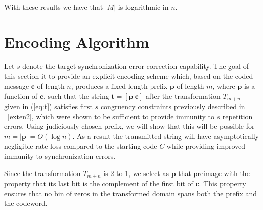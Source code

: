  With these results we have that
$|M|$ is logarithmic in $n$.


\section{Encoding Algorithm}\label{enc}

Let $s$ denote the target synchronization error correction
capability. The goal of this section it to provide an explicit
encoding scheme which, based on the coded message $\mathbf{c}$ of
length $n$, produces a fixed length prefix $\mathbf{p}$ of length
$m$, where $\mathbf{p}$ is a function of $\mathbf{c}$, such that the
string $\mathbf{t}=[ \mathbf{p} ~ \mathbf{c} ]$ after the
transformation $T_{m+n}$ given in (\ref{eq:t}) satisfies first $s$
congruency constraints previously described  in ~\eqref{exten2},
which were shown to be sufficient to provide immunity to $s$
repetition errors. Using judiciously chosen prefix, we will show
that this will be possible for $m=|\mathbf{p}|=O(\log n)$. As a
result the transmitted string will have asymptotically negligible
rate loss compared to the starting code $C$ while providing improved
immunity to synchronization errors.

Since the transformation $T_{m+n}$ is 2-to-1, we select as
$\mathbf{p}$ that preimage with the property that its last bit is
the complement of the first bit of $\mathbf{c}$. This property
ensures that no bin of zeros in the transformed domain spans both
the prefix and the codeword.







